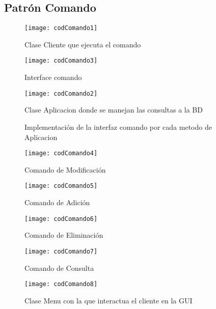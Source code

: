 \subsection{Patrón Comando}
\begin{figure}[H]

	\texttt{[image: codComando1]}

	\caption{Clase Cliente que ejecuta el comando}
	\label{fig:codComando1}
\end{figure}
\begin{figure}[H]

	\texttt{[image: codComando3]}

	\caption{Interface comando}
	\label{fig:codComando3}
	
\end{figure}
\clearpage
\begin{figure}[H]

	\texttt{[image: codComando2]}

	\caption{Clase Aplicacion donde se manejan las consultas a la BD}
	\label{fig:codComando2}
\end{figure}

\begin{figure}[H]
	\centering
	\caption{Implementación de la interfaz comando por cada metodo de Aplicacion}
	\texttt{[image: codComando4]}
	\caption{Comando de Modificación}
	\centering
	\label{fig:codComando4}
\end{figure}
\clearpage
\begin{figure}[H]
	\centering
	\texttt{[image: codComando5]}
	\centering
	\caption{Comando de Adición}
	\label{fig:codComando5}
\end{figure}

\begin{figure}[H]
	\centering
	\texttt{[image: codComando6]}
	\centering
	\caption{Comando de Eliminación}
	\label{fig:codComando6}
\end{figure}
\clearpage
\begin{figure}[H]
	\centering
	\texttt{[image: codComando7]}
	\centering
	\caption{Comando de Consulta}
	\label{fig:codComando7}
\end{figure}

\begin{figure}[H]
	\centering
	\texttt{[image: codComando8]}
	\centering
	\caption{Clase Menu con la que interactua el cliente en la GUI}
	\label{fig:codComando8}
\end{figure}

